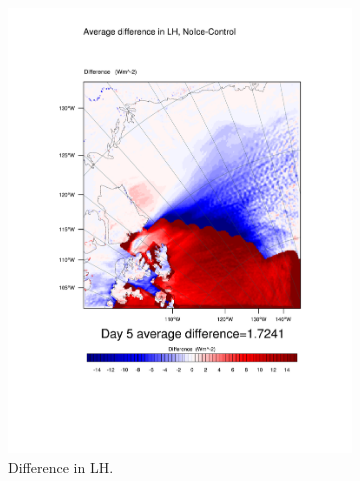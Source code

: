 \begin{figure}
\centering
	\begin{subfigure}{0.48\textwidth}
		\includegraphics[width=\textwidth]{results/noice/diff_NoIce_LH_Day5.pdf}
		\caption{Difference in LH.}
		\label{subfig:lh_r2Day5}
	\end{subfigure}
	\quad
		\begin{subfigure}{0.48\textwidth}

\end{subfigure}
\end{figure}
